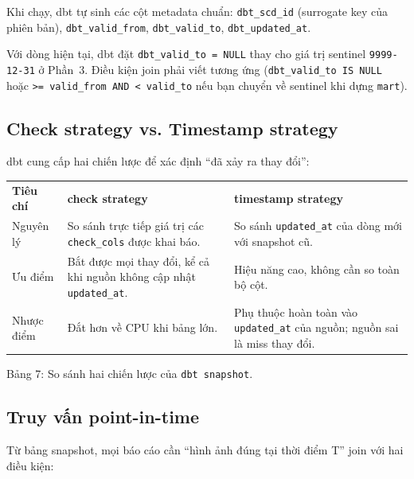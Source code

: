 \documentclass[12pt]{article}
\begin{document}
Khi chạy, dbt tự sinh các cột metadata chuẩn: \texttt{dbt\_scd\_id} (surrogate key của phiên bản), \texttt{dbt\_valid\_from}, \texttt{dbt\_valid\_to}, \texttt{dbt\_updated\_at}.

\begin{notebox}
Với dòng hiện tại, dbt đặt \texttt{dbt\_valid\_to = NULL} thay cho giá trị sentinel \texttt{9999-12-31} ở Phần~3. Điều kiện join phải viết tương ứng (\texttt{dbt\_valid\_to IS NULL} hoặc \texttt{>= valid\_from AND < valid\_to} nếu bạn chuyển về sentinel khi dựng \texttt{mart}).
\end{notebox}

\subsection{Check strategy vs. Timestamp strategy}

dbt cung cấp hai chiến lược để xác định ``đã xảy ra thay đổi'':

\noindent
\begin{longtable}{@{}>{\RaggedRight\arraybackslash}p{2.8cm}>{\RaggedRight\arraybackslash}p{6.0cm}>{\RaggedRight\arraybackslash}p{5.4cm}@{}}
\rowcolor{rowLavender}
\textbf{Tiêu chí} & \textbf{check strategy} & \textbf{timestamp strategy} \\
\addlinespace[3pt]
\endhead
Nguyên lý & So sánh trực tiếp giá trị các \texttt{check\_cols} được khai báo. & So sánh \texttt{updated\_at} của dòng mới với snapshot cũ. \\
\addlinespace[3pt]
Ưu điểm & Bắt được mọi thay đổi, kể cả khi nguồn không cập nhật \texttt{updated\_at}. & Hiệu năng cao, không cần so toàn bộ cột. \\
\addlinespace[3pt]
Nhược điểm & Đắt hơn về CPU khi bảng lớn. & Phụ thuộc hoàn toàn vào \texttt{updated\_at} của nguồn; nguồn sai là miss thay đổi. \\
\end{longtable}

\begin{captionbelowboxaivn}
Bảng 7: So sánh hai chiến lược của \texttt{dbt snapshot}.
\end{captionbelowboxaivn}

\subsection{Truy vấn point-in-time}

Từ bảng snapshot, mọi báo cáo cần ``hình ảnh đúng tại thời điểm T'' join với hai điều kiện:
\end{document}

